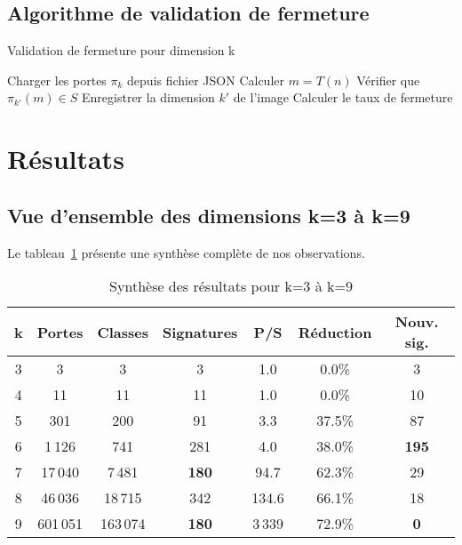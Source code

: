 \documentclass[12pt,a4paper]{article}
\theoremstyle{remark}
\begin{document}
\subsection{Algorithme de validation de fermeture}

\begin{algorithm}
\caption{Validation de fermeture pour dimension k}
\begin{algorithmic}
\STATE Charger les portes $\pi_k$ depuis fichier JSON
        \STATE Calculer $m = T(n)$
        \STATE Vérifier que $\pi_{k'}(m) \in S$
        \STATE Enregistrer la dimension $k'$ de l'image
    \ENDIF
\ENDFOR
\STATE Calculer le taux de fermeture
\end{algorithmic}
\end{algorithm}


\section{Résultats}
\label{sec:resultats}

\subsection{Vue d'ensemble des dimensions k=3 à k=9}

Le tableau~\ref{tab:synthese} présente une synthèse complète de nos observations.

\begin{table}[h]
\centering
\caption{Synthèse des résultats pour k=3 à k=9}
\label{tab:synthese}
\begin{tabular}{ccccccc}
\toprule
\textbf{k} & \textbf{Portes} & \textbf{Classes} & \textbf{Signatures} & \textbf{P/S} & \textbf{Réduction} & \textbf{Nouv. sig.}\\
\midrule
3 & 3 & 3 & 3 & 1.0 & 0.0\% & 3\\
4 & 11 & 11 & 11 & 1.0 & 0.0\% & 10\\
5 & 301 & 200 & 91 & 3.3 & 37.5\% & 87\\
6 & 1\,126 & 741 & 281 & 4.0 & 38.0\% & \textbf{195}\\
7 & 17\,040 & 7\,481 & \textbf{180} & 94.7 & 62.3\% & 29\\
8 & 46\,036 & 18\,715 & 342 & 134.6 & 66.1\% & 18\\
9 & 601\,051 & 163\,074 & \textbf{180} & 3\,339 & 72.9\% & \textbf{0}\\
\bottomrule
\end{tabular}
\end{table}
\end{document}
